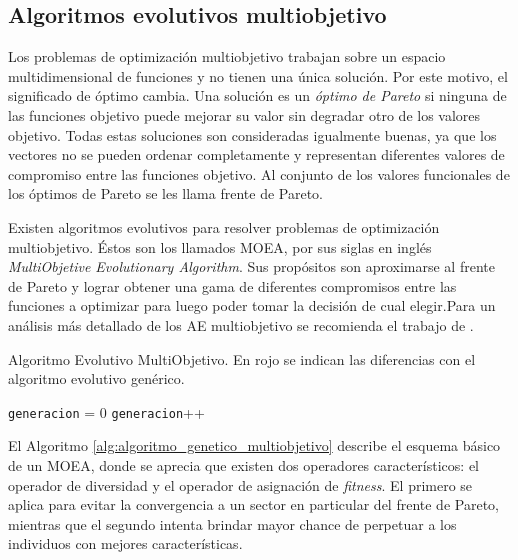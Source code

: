 \subsection{Algoritmos evolutivos multiobjetivo}

Los problemas de optimización multiobjetivo trabajan sobre un espacio multidimensional de funciones y no tienen una única solución. Por este motivo, el significado de óptimo cambia. Una solución es un \emph{óptimo de Pareto} si ninguna de las funciones objetivo puede mejorar su valor sin degradar otro de los valores objetivo. Todas estas soluciones son consideradas igualmente buenas, ya que los vectores no se pueden ordenar completamente y representan diferentes valores de compromiso entre las funciones objetivo. Al conjunto de los valores funcionales de los óptimos de Pareto se les llama frente de Pareto.

Existen algoritmos evolutivos para resolver problemas de optimización multiobjetivo. 
Éstos son los llamados MOEA, por sus siglas en inglés \emph{ MultiObjetive Evolutionary Algorithm}. Sus propósitos son aproximarse al frente de Pareto y lograr obtener una gama de diferentes compromisos entre las funciones a optimizar para luego poder tomar la decisión de cual elegir.Para un análisis más detallado de los AE multiobjetivo se recomienda el trabajo de \citet{Deb2001}.


\begin{algorithm}%
	\caption{Algoritmo Evolutivo MultiObjetivo. En rojo se indican las diferencias con el algoritmo evolutivo genérico.}
	\label{alg:algoritmo_genetico_multiobjetivo}
	\begin{algorithmic} [1] 
		{
			\STATE \texttt{generacion} = 0
			\STATE {\textcolor{red}{Operador Diversidad (Pob(generacion))}}
			\STATE {\textcolor{red}{Asignar Fitness (Pob(generacion))}}
			\STATE \texttt{generacion}++
			\ENDWHILE
			\RETURN 	{\textcolor{red}{Frente de Pareto}}
		}
	\end{algorithmic}
\end{algorithm}

El Algoritmo \ref{alg:algoritmo_genetico_multiobjetivo} describe el esquema básico de un MOEA, donde se aprecia que existen dos operadores característicos: el operador de diversidad y el operador de asignación de \emph{fitness}. El primero se aplica para evitar la convergencia a un sector en particular del frente de Pareto, mientras que el segundo intenta brindar mayor chance de perpetuar a los individuos con mejores características.

